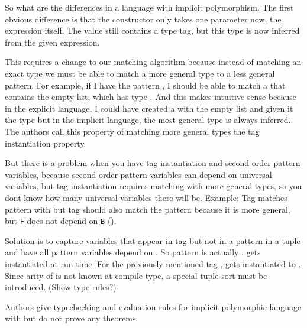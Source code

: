 \documentclass[12pt]{article}	%
\begin{document}
So what are the differences in a language with implicit polymorphism. The first obvious difference is that the constructor only takes one parameter now, the expression itself. The \Dynamic value still contains a type tag, but this type is now inferred from the given expression.

This requires a change to our matching algorithm because instead of matching an exact type we must be able to match a more general type to a less general pattern. For example, if I have the pattern , I should be able to match a \Dynamic that contains the empty list, which has type . And this makes intuitive sense because in the explicit language, I could have created a \Dynamic with the empty list and given it the type  but in the implicit language, the most general type is always inferred. The authors call this property of matching more general types the tag instantiation property.

But there is a problem when you have tag instantiation and second order pattern variables, because second order pattern variables can depend on universal variables, but tag instantiation requires matching with more general types, so you dont know how many universal variables there will be. 
	Example:
	Tag  matches pattern  with  but tag  should also match the pattern because it is more general, but \texttt{F} does not depend on \texttt{B} ().
	
	Solution is to capture variables that appear in tag but not in a pattern in a tuple  and have all pattern variables depend on . So pattern  is actually  .  gets instantiated at run time. For the previously mentioned tag ,  gets instantiated to . Since arity of  is not known at compile type, a special tuple sort must be introduced. (Show type rules?)
	
	Authors give typechecking and evaluation rules for implicit polymorphic language with \Dynamic but do not prove any theorems.
	
\end{document}
